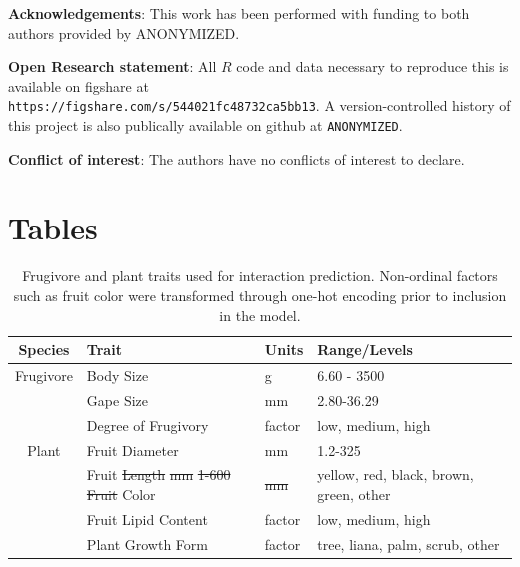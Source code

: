 \documentclass[num-refs]{article}%
\providecommand{\DIFadd}[1]{{\protect\color{blue}\uwave{#1}}} %
\providecommand{\DIFdel}[1]{{\protect\color{red}\sout{#1}}}                      %
\providecommand{\DIFaddbegin}{} %
\providecommand{\DIFaddend}{} %
\providecommand{\DIFdelbegin}{} %
\providecommand{\DIFdelend}{} %
\providecommand{\DIFaddFL}[1]{\DIFadd{#1}} %
\providecommand{\DIFdelFL}[1]{\DIFdel{#1}} %
\providecommand{\DIFaddbeginFL}{} %
\providecommand{\DIFaddendFL}{} %
\providecommand{\DIFdelbeginFL}{} %
\providecommand{\DIFdelendFL}{} %
\newcommand{\DIFscaledelfig}{0.5}
\newlength{\DIFdelgraphicswidth} %
\newlength{\DIFdelgraphicsheight} %
\newcommand{\DIFaddincludegraphics}[2][]{{\color{blue}\fbox{\DIFOincludegraphics[#1]{#2}}}} %
\newcommand{\DIFdelincludegraphics}[2][]{%
\sbox{\DIFdelgraphicsbox}{\DIFOincludegraphics[#1]{#2}}%
\settoboxwidth{\DIFdelgraphicswidth}{\DIFdelgraphicsbox} %
\settoboxtotalheight{\DIFdelgraphicsheight}{\DIFdelgraphicsbox} %
\scalebox{\DIFscaledelfig}{%
\parbox[b]{\DIFdelgraphicswidth}{\usebox{\DIFdelgraphicsbox}\\[-\baselineskip] \rule{\DIFdelgraphicswidth}{0em}}\llap{\resizebox{\DIFdelgraphicswidth}{\DIFdelgraphicsheight}{%
\setlength{\unitlength}{\DIFdelgraphicswidth}%
\begin{picture}(1,1)%
\thicklines\linethickness{2pt} %
{\color[rgb]{1,0,0}\put(0,0){\framebox(1,1){}}}%
{\color[rgb]{1,0,0}\put(0,0){\line( 1,1){1}}}%
{\color[rgb]{1,0,0}\put(0,1){\line(1,-1){1}}}%
\end{picture}%
}\hspace*{3pt}}} %
} %
\DeclareRobustCommand{\DIFaddbegin}{\DIFOaddbegin \let\includegraphics\DIFaddincludegraphics} %
\DeclareRobustCommand{\DIFaddend}{\DIFOaddend \let\includegraphics\DIFOincludegraphics} %
\DeclareRobustCommand{\DIFdelbegin}{\DIFOdelbegin \let\includegraphics\DIFdelincludegraphics} %
\DeclareRobustCommand{\DIFdelend}{\DIFOaddend \let\includegraphics\DIFOincludegraphics} %
\DeclareRobustCommand{\DIFaddbeginFL}{\DIFOaddbeginFL \let\includegraphics\DIFaddincludegraphics} %
\DeclareRobustCommand{\DIFaddendFL}{\DIFOaddendFL \let\includegraphics\DIFOincludegraphics} %
\DeclareRobustCommand{\DIFdelbeginFL}{\DIFOdelbeginFL \let\includegraphics\DIFdelincludegraphics} %
\DeclareRobustCommand{\DIFdelendFL}{\DIFOaddendFL \let\includegraphics\DIFOincludegraphics} %
\begin{document}
\noindent \textbf{Acknowledgements}: This work has been performed with funding to both authors provided by ANONYMIZED. 

\noindent \textbf{Open Research statement}: All $R$ code and data necessary to reproduce this is available on figshare at \\ \texttt{https://figshare.com/s/544021fc48732ca5bb13}. A version-controlled history of this project is also publically available on github at \texttt{ANONYMIZED}.

\noindent \textbf{Conflict of interest}: The authors have no conflicts of interest to declare.



\clearpage
\DIFdelbegin %
\DIFdelend \DIFaddbegin 
\DIFaddend 

\clearpage 

\section*{Tables} 


\begin{table}[!h]
\caption{Frugivore and plant traits used for interaction prediction. Non-ordinal factors such as fruit color were transformed through one-hot encoding prior to inclusion in the model.}
\label{tab:traits}
\begin{tabular}{clll} 
 \hline
 Species & Trait & Units & Range/Levels \\  
 \hline
 \hline
Frugivore & Body Size &  g &  6.60 - 3500 \\
& Gape Size &   mm  & 2.80-36.29  \\  
& Degree of Frugivory & factor   &  low, medium, high \\  
Plant & Fruit Diameter &  mm  & 1.2-325  \\
& Fruit \DIFdelbeginFL \DIFdelFL{Length }%
\DIFdelFL{mm  }%
\DIFdelFL{1-600 }%
\DIFdelFL{Fruit }\DIFdelendFL Color &  \DIFdelbeginFL \DIFdelFL{mm  }\DIFdelendFL \DIFaddbeginFL \DIFaddFL{factor  }\DIFaddendFL & yellow, red, black, brown, green, other \\
& Fruit Lipid Content & factor   &  low, medium, high  \\ 
& Plant Growth Form &   factor  &  tree, liana, palm, scrub, other \\ 
 \hline
\end{tabular}
\end{table}
\end{document}
